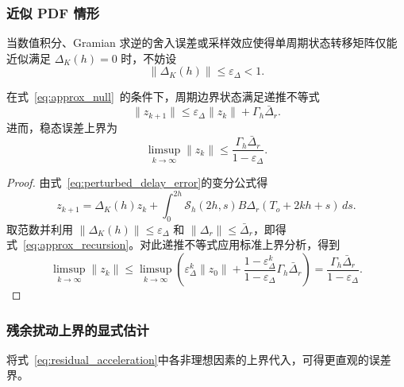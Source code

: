 \subsubsection{近似 PDF 情形}

当数值积分、Gramian 求逆的舍入误差或采样效应使得单周期状态转移矩阵仅能近似满足 \(\Delta_K(h)=0\) 时，不妨设
\begin{equation}
\|\Delta_K(h)\| \le \varepsilon_\Delta < 1.
\label{eq:approx_null}
\end{equation}

\begin{proposition}[近似零化下的稳态上界]\label{prop:approx_null}
  在式~\eqref{eq:approx_null}~的条件下，周期边界状态满足递推不等式
  \begin{equation}
  \|z_{k+1}\| \le \varepsilon_\Delta\|z_k\| + \Gamma_h\bar\Delta_r.
  \label{eq:approx_recursion}
  \end{equation}
  进而，稳态误差上界为
  \begin{equation}
  \limsup_{k\to\infty} \|z_k\| \le \frac{\Gamma_h\bar\Delta_r}{1-\varepsilon_\Delta}.
  \label{eq:approx_ultimate}
  \end{equation}
\end{proposition}

\begin{proof}
  由式~\eqref{eq:perturbed_delay_error}的变分公式得
  \[
  z_{k+1} = \Delta_K(h)z_k + \int_0^{2h} \mathcal S_h(2h,s)B\Delta_r(T_o+2kh+s)\,ds.
  \]
  取范数并利用 \(\|\Delta_K(h)\|\le\varepsilon_\Delta\) 和 \(\|\Delta_r\|\le\bar\Delta_r\)，即得式~\eqref{eq:approx_recursion}。对此递推不等式应用标准上界分析，得到
  \[
  \limsup_{k\to\infty} \|z_k\|
  \le \limsup_{k\to\infty} \left(\varepsilon_\Delta^{k}\|z_0\| + \frac{1-\varepsilon_\Delta^{k}}{1-\varepsilon_\Delta}\Gamma_h\bar\Delta_r\right)
  = \frac{\Gamma_h\bar\Delta_r}{1-\varepsilon_\Delta}.
  \]
\end{proof}

\subsubsection{残余扰动上界的显式估计}

将式~\eqref{eq:residual_acceleration}中各非理想因素的上界代入，可得更直观的误差界。

